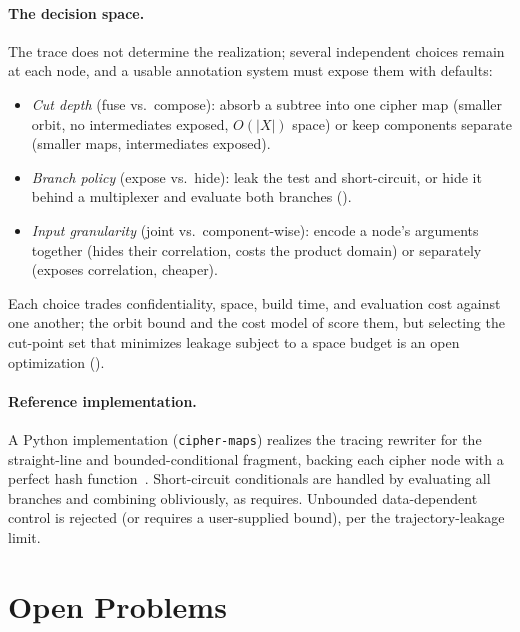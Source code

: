 \documentclass[11pt]{article}
\theoremstyle{definition}
\theoremstyle{plain}
\theoremstyle{remark}
\begin{document}
\paragraph{The decision space.}
The trace does not determine the realization; several independent
choices remain at each node, and a usable annotation system must expose
them with defaults:
\begin{itemize}
\item \emph{Cut depth} (fuse vs.\ compose): absorb a subtree into one
  cipher map (smaller orbit, no intermediates exposed, $O(|X|)$ space)
  or keep components separate (smaller maps, intermediates exposed).
\item \emph{Branch policy} (expose vs.\ hide): leak the test and
  short-circuit, or hide it behind a multiplexer and evaluate both
  branches ().
\item \emph{Input granularity} (joint vs.\ component-wise): encode a
  node's arguments together (hides their correlation, costs the product
  domain) or separately (exposes correlation, cheaper).
\end{itemize}
Each choice trades confidentiality, space, build time, and evaluation
cost against one another; the orbit bound and the cost model of
 score them, but selecting the cut-point set that
minimizes leakage subject to a space budget is an open optimization
().

\paragraph{Reference implementation.}
A Python implementation (\texttt{cipher-maps}) realizes the tracing
rewriter for the straight-line and bounded-conditional fragment, backing
each cipher node with a perfect hash function~\cite{fredman1984storing}.
Short-circuit conditionals are handled by evaluating all branches and
combining obliviously, as  requires.
Unbounded data-dependent control is rejected (or requires a
user-supplied bound), per the trajectory-leakage limit.


\section{Open Problems}
\label{sec:open}
\end{document}
